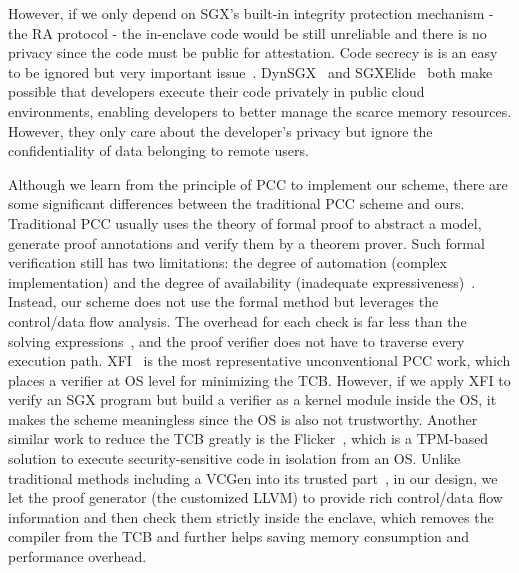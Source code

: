 {However, if we only depend on SGX's built-in integrity protection mechanism - the RA protocol - the in-enclave code would be still unreliable and there is no privacy since the code must be public for attestation.
Code secrecy is is an easy to be ignored but very important issue~\cite{mazmudar2019mitigator,kuccuk2019managing}.
DynSGX~\cite{silva2017dynsgx} and SGXElide~\cite{bauman2018sgxelide} both make possible that developers execute their code privately in public cloud environments, enabling developers to better manage the scarce memory resources. However, they only care about the developer's privacy but ignore the confidentiality of data belonging to remote users. 




Although we learn from the principle of PCC to implement our scheme, there are some significant differences between the traditional PCC scheme and ours. Traditional PCC usually uses the theory of formal proof to abstract a model, generate proof annotations and verify them by a theorem prover. Such formal verification still has two limitations: the degree of automation (complex implementation) and the degree of availability (inadequate expressiveness)~\cite{d2008survey}. Instead, our scheme does not use the formal method but leverages the control/data flow analysis. The overhead for each check is far less than the solving expressions~\cite{de2008z3}, and the proof verifier does not have to traverse every execution path. XFI~\cite{erlingsson2006xfi} is the most representative unconventional PCC work, which places a verifier at OS level for minimizing the TCB. 
However, if we apply XFI to verify an SGX program but build a verifier as a kernel module inside the OS, it makes the scheme meaningless since the OS is also not trustworthy. 
Another similar work to reduce the TCB greatly is the Flicker~\cite{mccune2008flicker}, which is a TPM-based solution to execute security-sensitive code in isolation from an OS.
Unlike traditional methods including a VCGen into its trusted part~\cite{necula1997proof}, in our design, we let the proof generator (the customized LLVM) to provide rich control/data flow information and then check them strictly inside the enclave, which removes the compiler from the TCB and further helps saving memory consumption and performance overhead.

}